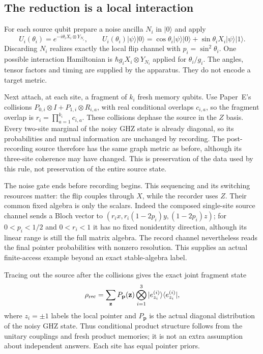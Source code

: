 \documentclass[12pt,a4paper]{article}
\begin{document}
\subsection{The reduction is a local interaction}
\label{sec:physical}

For each source qubit prepare a noise ancilla $N_i$ in $|0\rangle$ and
apply
\[
U_i(\theta_i)=e^{-i\theta_i X_i\otimes Y_{N_i}},
\qquad
U_i(\theta_i)|\psi\rangle|0\rangle
 =\cos\theta_i|\psi\rangle|0\rangle
  +\sin\theta_i X_i|\psi\rangle|1\rangle .
\]
Discarding $N_i$ realizes exactly the local flip channel with
$p_i=\sin^2\theta_i$. One possible interaction Hamiltonian is
$\hbar g_iX_i\otimes Y_{N_i}$ applied for $\theta_i/g_i$.
The angles, tensor factors and timing are supplied by the apparatus.
They do not encode a target metric.

Next attach, at each site, a fragment of $k_i$ fresh memory qubits.
Use Paper~E's collisions
$P_{0,i}\otimes I+P_{1,i}\otimes R_{i,a}$, with real conditional
overlaps $c_{i,a}$, so the fragment overlap is
$r_i=\prod_{a=1}^{k_i}c_{i,a}$. These collisions dephase the source in
the $Z$ basis. Every two-site marginal of the noisy GHZ state is
already diagonal, so its probabilities and mutual information are
unchanged by recording. The post-recording source therefore has the
same graph metric as before, although its three-site coherence may
have changed. This is preservation of the data used by this rule,
not preservation of the entire source state.

The noise gate ends before recording begins. This sequencing and its
switching resources matter: the flip couples through $X$, while the
recorder uses $Z$. Their common fixed algebra is only the scalars.
Indeed the composed single-site source channel sends a Bloch vector to
$(r_i x,r_i(1-2p_i)y,(1-2p_i)z)$; for $0<p_i<1/2$ and $0<r_i<1$
it has no fixed nonidentity direction, although its linear range is
still the full matrix algebra. The record channel nevertheless reads
the final pointer probabilities with nonzero resolution. This supplies
an actual finite-access example beyond an exact stable-algebra label.

Tracing out the source after the collisions gives the exact joint
fragment state
\begin{equation}
\rho_{\rm rec}
 =\sum_{\mathbf z}P_{\mathbf p}(\mathbf z)
       \bigotimes_{i=1}^3 |e_{z_i}^{(i)}\rangle
                         \langle e_{z_i}^{(i)}|,
\label{eq:joint-record}
\end{equation}
where $z_i=\pm1$ labels the local pointer and
$P_{\mathbf p}$ is the actual diagonal distribution of the noisy GHZ
state. Thus conditional product structure follows from the unitary
couplings and fresh product memories; it is not an extra assumption
about independent answers. Each site has equal pointer priors.
\end{document}
